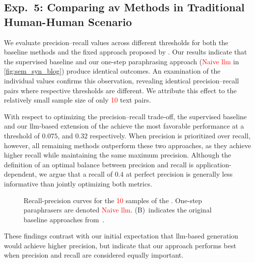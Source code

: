 \subsection{Exp.\ 5: Comparing \acs{av} Methods in Traditional Human-Human Scenario}
\label{subsec:imp_gen_res}

We evaluate precision–recall values across different thresholds for both the baseline methods and the fixed approach proposed by \citet{koppel_determining_2014}.
Our results indicate that the supervised baseline and our one-step paraphrasing approach (\textcolor{red}{Naive \ac{llm}} in \autoref{fig:sem_syn_blog}) produce identical outcomes.
An examination of the individual values confirms this observation, revealing identical precision–recall pairs where respective thresholds are different.
We attribute this effect to the relatively small sample size of only \textcolor{red}{10} text pairs.

With respect to optimizing the precision–recall trade-off, the supervised baseline and our \ac{llm}-based extension of the \impAppr{} achieve the most favorable performance at a threshold of $0.075$, and $0.32$ respectively.
When precision is prioritized over recall, however, all remaining methods outperform these two approaches, as they achieve higher recall while maintaining the same maximum precision.
Although the definition of an optimal balance between precision and recall is application-dependent, we argue that a recall of $0.4$ at perfect precision is generally less informative than jointly optimizing both metrics.

\begin{figure}[htbp]
    \centering
    
    \caption[Recall-precision curves for the \dataStudent{}.]{Recall-precision curves for the \textcolor{red}{10} samples of the \dataStudent{}. 
    One-step paraphrasers are denoted \textcolor{red}{Naive \ac{llm}}.
    (B)~indicates the original baseline approaches from~\citep{koppel_determining_2014}.
    }
    \label{fig:sem_syn_blog}
\end{figure}

These findings contrast with our initial expectation that \ac{llm}-based \imp{} generation would achieve higher precision, but indicate that our approach performs best when precision and recall are considered equally important.
